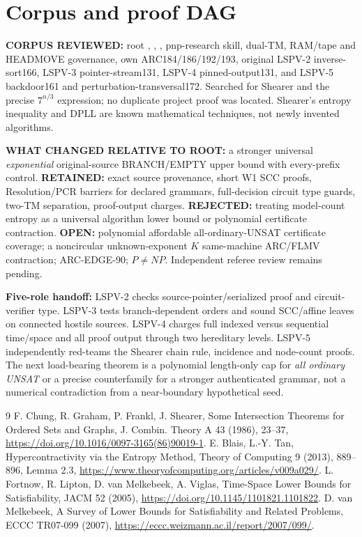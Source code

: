 \documentclass[11pt]{article}
\begin{document}
\section{Corpus and proof DAG}
\textbf{CORPUS REVIEWED:} root , ,
, pnp-research skill, dual-TM, RAM/tape and
HEADMOVE governance, own ARC184/186/192/193, original
LSPV-2 inverse-sort166, LSPV-3 pointer-stream131,
LSPV-4 pinned-output131, and LSPV-5 backdoor161 and
perturbation-transversal172. Searched for Shearer and the precise
$7^{n/3}$ expression; no duplicate project proof was located.
Shearer's entropy inequality and DPLL are known mathematical
techniques, not newly invented algorithms.

\textbf{WHAT CHANGED RELATIVE TO ROOT:}
a stronger universal \emph{exponential} original-source
BRANCH/EMPTY upper bound with every-prefix control.
\textbf{RETAINED:} exact source provenance, short W1 SCC proofs,
Resolution/PCR barriers for declared grammars, full-decision
circuit type guards, two-TM separation, proof-output charges.
\textbf{REJECTED:} treating model-count entropy as a universal
algorithm lower bound or polynomial certificate contraction.
\textbf{OPEN:} polynomial affordable all-ordinary-UNSAT
certificate coverage; a noncircular unknown-exponent $K$
same-machine ARC/FLMV contraction; ARC-EDGE-90; $P\ne NP$.
Independent referee review remains pending.

\textbf{Five-role handoff:}
LSPV-2 checks source-pointer/serialized proof and circuit-verifier
type. LSPV-3 tests branch-dependent orders and sound SCC/affine
leaves on connected hostile sources. LSPV-4 charges
full indexed versus sequential time/space and all proof output
through two hereditary levels. LSPV-5 independently red-teams
the Shearer chain rule, incidence and node-count proofs.
The next load-bearing theorem is a polynomial length-only cap
for \emph{all ordinary UNSAT} or a precise counterfamily for
a stronger authenticated grammar, not a numerical contradiction
from a near-boundary hypothetical seed.

\begin{thebibliography}{9}
 F. Chung, R. Graham, P. Frankl, J. Shearer,
Some Intersection Theorems for Ordered Sets and Graphs,
J. Combin. Theory A 43 (1986), 23--37,
\url{https://doi.org/10.1016/0097-3165(86)90019-1}.
 E. Blais, L.-Y. Tan,
Hypercontractivity via the Entropy Method, Theory of Computing 9
(2013), 889--896, Lemma 2.3,
\url{https://www.theoryofcomputing.org/articles/v009a029/}.
 L. Fortnow, R. Lipton, D. van Melkebeek, A. Viglas,
Time-Space Lower Bounds for Satisfiability, JACM 52 (2005),
\url{https://doi.org/10.1145/1101821.1101822}.
 D. van Melkebeek, A Survey of Lower Bounds for
Satisfiability and Related Problems, ECCC TR07-099 (2007),
\url{https://eccc.weizmann.ac.il/report/2007/099/}.
\end{thebibliography}
\end{document}
